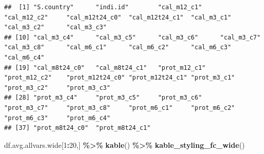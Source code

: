 \documentclass[
]{book}
\newenvironment{Shaded}{\begin{snugshade}}{\end{snugshade}}
\newcommand{\DecValTok}[1]{\textcolor[rgb]{0.00,0.00,0.81}{#1}}
\newcommand{\KeywordTok}[1]{\textcolor[rgb]{0.13,0.29,0.53}{\textbf{#1}}}
\newcommand{\NormalTok}[1]{#1}
\newcommand{\OperatorTok}[1]{\textcolor[rgb]{0.81,0.36,0.00}{\textbf{#1}}}
\newcommand{\StringTok}[1]{\textcolor[rgb]{0.31,0.60,0.02}{#1}}
\begin{document}
\begin{verbatim}
##  [1] "S.country"      "indi.id"        "cal_m12_c1"     "cal_m12_c2"     "cal_m12t24_c0"  "cal_m12t24_c1"  "cal_m3_c1"      "cal_m3_c2"      "cal_m3_c3"     
## [10] "cal_m3_c4"      "cal_m3_c5"      "cal_m3_c6"      "cal_m3_c7"      "cal_m3_c8"      "cal_m6_c1"      "cal_m6_c2"      "cal_m6_c3"      "cal_m6_c4"     
## [19] "cal_m8t24_c0"   "cal_m8t24_c1"   "prot_m12_c1"    "prot_m12_c2"    "prot_m12t24_c0" "prot_m12t24_c1" "prot_m3_c1"     "prot_m3_c2"     "prot_m3_c3"    
## [28] "prot_m3_c4"     "prot_m3_c5"     "prot_m3_c6"     "prot_m3_c7"     "prot_m3_c8"     "prot_m6_c1"     "prot_m6_c2"     "prot_m6_c3"     "prot_m6_c4"    
## [37] "prot_m8t24_c0"  "prot_m8t24_c1"
\end{verbatim}

\begin{Shaded}
\begin{Highlighting}[]
\NormalTok{df.avg.allvars.wide[}\DecValTok{1}\OperatorTok{:}\DecValTok{20}\NormalTok{,] }\OperatorTok{\%\textgreater{}\%}\StringTok{ }\KeywordTok{kable}\NormalTok{() }\OperatorTok{\%\textgreater{}\%}\StringTok{ }\KeywordTok{kable\_styling\_fc\_wide}\NormalTok{()}
\end{Highlighting}
\end{Shaded}
\end{document}
